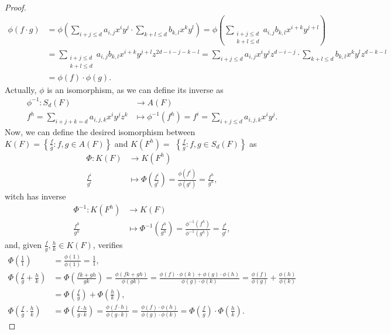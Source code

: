 \documentclass[11pt,a4paper]{article}
\begin{document}
\begin{proof}
  \begin{align*}
    \phi(f \cdot g) &= \phi\left(\sum_{i + j \leq d} a_{i,j} x^i y^j \cdot \sum_{k + l \leq d} b_{k,l} x^k y^l\right) = \phi\left(\sum_{\substack{i + j \leq d\\k + l \leq d}} a_{i,j} b_{k,l} x^{i+k} y^{j+l} \right) \\
    &= \sum_{\substack{i + j \leq d\\k + l \leq d}} a_{i,j} b_{k,l} x^{i+k} y^{j+l} z^{2d-i-j-k-l} = \sum_{i + j \leq d} a_{i,j} x^{i} y^{j} z^{d-i-j} \cdot \sum_{k + l \leq d} b_{k,l} x^{k} y^{l} z^{d-k-l} \\
    &= \phi(f) \cdot \phi(g).
  \end{align*}
  Actually, $ \phi $ is an isomorphism, as we can define its inverse as
  \begin{align*}
    \phi^{-1}: S_d(F) &\longrightarrow A(F) \\
    f^h = \sum_{i+j+k = d} a_{i,j,k} x^i y^j z^k &\longmapsto \phi^{-1} (f^h) = f^i = \sum_{i+j \leq d} a_{i,j,k} x^i y^j.
  \end{align*}
  Now, we can define the desired isomorphism between $ K(F) = \left\{\frac{f}{g}: f, g \in A(F)\right\} $ and $ K(F^h) = $ $ \left\{\frac{f}{g}: f, g \in S_d(F)\right\} $ as
  \begin{align*}
    \Phi: K(F) &\longrightarrow K(F^h) \\
    \frac{f^i}{g^i} &\longmapsto \Phi \left(\frac{f^i}{g^i}\right)= \frac{\phi(f^i)}{\phi(g^i)} = \frac{f^h}{g^h},
  \end{align*}
  witch has inverse
  \begin{align*}
    \Phi^{-1}: K(F^h) &\longrightarrow K(F) \\
    \frac{f^h}{g^h} &\longmapsto \Phi^{-1} \left(\frac{f^h}{g^h}\right)= \frac{\phi^{-1}(f^h)}{\phi^{-1}(g^h)} = \frac{f^i}{g^i},
  \end{align*}
  and, given $ \frac{f}{g}, \frac{h}{k} \in K(F) $, verifies
  \begin{align*}
    \Phi(\frac{1}{1}) &= \frac{\phi(1)}{\phi(1)} = \frac{1}{1}, \\
    \Phi(\frac{f}{g} + \frac{h}{k}) &= \Phi(\frac{fk + gh}{gk}) = \frac{\phi(fk + gh)}{\phi(gk)} = \frac{\phi(f) \cdot \phi(k) + \phi(g) \cdot\phi(h)}{\phi(g) \cdot \phi(k)} = \frac{\phi(f)}{\phi(g)} + \frac{\phi(h)}{\phi(k)} \\
    &= \Phi(\frac{f}{g}) + \Phi(\frac{h}{k}), \\
    \Phi(\frac{f}{g} \cdot \frac{h}{k}) &= \Phi(\frac{f\cdot h}{g \cdot k}) = \frac{\phi(f\cdot h)}{\phi(g \cdot k)} = \frac{\phi(f) \cdot \phi(h)}{\phi(g) \cdot \phi(k)} = \Phi(\frac{f}{g})\cdot \Phi(\frac{h}{k}).
  \end{align*}
\end{proof}
\end{document}
